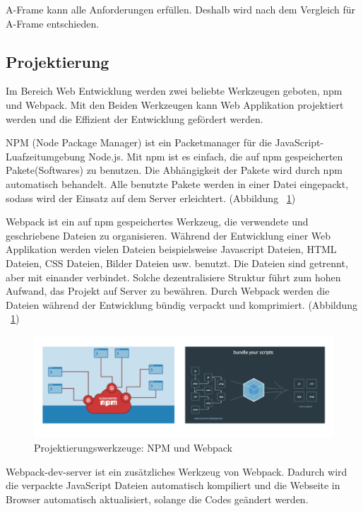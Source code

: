  A-Frame kann alle Anforderungen erfüllen. Deshalb wird nach dem Vergleich für A-Frame entschieden.
 
 \subsection{Projektierung}
 Im Bereich Web Entwicklung werden zwei beliebte Werkzeugen geboten, npm und Webpack. Mit den Beiden Werkzeugen kann Web Applikation projektiert werden und die Effizient der Entwicklung gefördert werden.
 
 NPM (Node Package Manager) ist ein Packetmanager für die JavaScript-Luafzeitumgebung Node.js. Mit npm ist es einfach, die auf npm gespeicherten Pakete(Softwares) zu benutzen. Die Abhängigkeit der Pakete wird durch npm automatisch behandelt. Alle benutzte Pakete werden in einer Datei eingepackt, sodass wird der Einsatz auf dem Server erleichtert. (Abbildung ~\ref{fig:npmWebpack})
 
 Webpack ist ein auf npm gespeichertes Werkzeug, die verwendete und geschriebene Dateien zu organisieren. Während der Entwicklung einer Web Applikation werden vielen Dateien beispielsweise Javascript Dateien, HTML Dateien, CSS Dateien, Bilder Dateien usw. benutzt. Die Dateien sind getrennt, aber mit einander verbindet. Solche dezentralisiere Struktur führt zum hohen Aufwand, das Projekt auf Server zu bewähren. Durch Webpack werden die Dateien während der Entwicklung bündig verpackt und komprimiert. (Abbildung ~\ref{fig:npmWebpack})
 
\begin{figure}[ht]
\centering
\includegraphics[width=\textwidth]{images/npmWebpack.png}
\caption[Projektierungswerkzeuge]{Projektierungswerkzeuge: NPM und Webpack}
\label{fig:npmWebpack}
\end{figure}
 
 Webpack-dev-server ist ein zusätzliches Werkzeug von Webpack. Dadurch wird die verpackte JavaScript Dateien automatisch kompiliert und die Webseite in Browser automatisch aktualisiert, solange die Codes geändert werden.
 
